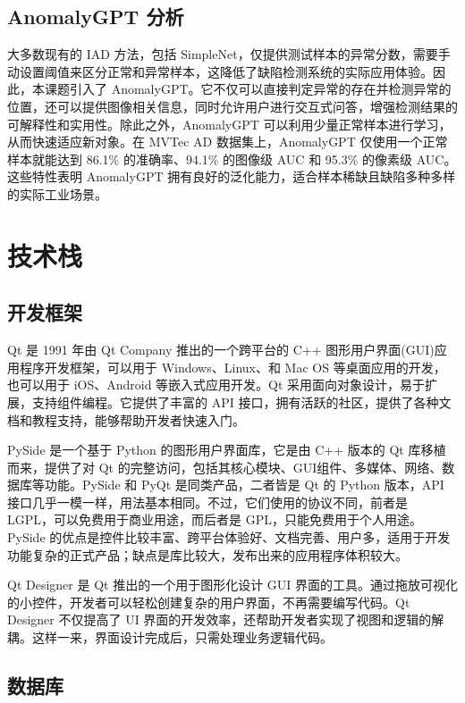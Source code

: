 \documentclass[
  ]{njuthesis}
\begin{document}
\subsection{AnomalyGPT 分析}

大多数现有的 IAD 方法，包括 SimpleNet，仅提供测试样本的异常分数，需要手动设置阈值来区分正常和异常样本，这降低了缺陷检测系统的实际应用体验。因此，本课题引入了 AnomalyGPT。它不仅可以直接判定异常的存在并检测异常的位置，还可以提供图像相关信息，同时允许用户进行交互式问答，增强检测结果的可解释性和实用性。除此之外，AnomalyGPT 可以利用少量正常样本进行学习，从而快速适应新对象。在 MVTec AD 数据集上，AnomalyGPT 仅使用一个正常样本就能达到 86.1\% 的准确率、94.1\% 的图像级 AUC 和 95.3\% 的像素级 AUC。这些特性表明 AnomalyGPT 拥有良好的泛化能力，适合样本稀缺且缺陷多种多样的实际工业场景。

\section{技术栈}

\subsection{开发框架}

Qt 是 1991 年由 Qt Company 推出的一个跨平台的 C++ 图形用户界面(GUI)应用程序开发框架，可以用于 Windows、Linux、和 Mac OS 等桌面应用的开发，也可以用于 iOS、Android 等嵌入式应用开发。Qt 采用面向对象设计，易于扩展，支持组件编程。它提供了丰富的 API 接口，拥有活跃的社区，提供了各种文档和教程支持，能够帮助开发者快速入门。

PySide 是一个基于 Python 的图形用户界面库，它是由 C++ 版本的 Qt 库移植而来，提供了对 Qt 的完整访问，包括其核心模块、GUI组件、多媒体、网络、数据库等功能。PySide 和 PyQt 是同类产品，二者皆是 Qt 的 Python 版本，API 接口几乎一模一样，用法基本相同。不过，它们使用的协议不同，前者是 LGPL，可以免费用于商业用途，而后者是 GPL，只能免费用于个人用途。PySide 的优点是控件比较丰富、跨平台体验好、文档完善、用户多，适用于开发功能复杂的正式产品；缺点是库比较大，发布出来的应用程序体积较大。

Qt Designer 是 Qt 推出的一个用于图形化设计 GUI 界面的工具。通过拖放可视化的小控件，开发者可以轻松创建复杂的用户界面，不再需要编写代码。Qt Designer 不仅提高了 UI 界面的开发效率，还帮助开发者实现了视图和逻辑的解耦。这样一来，界面设计完成后，只需处理业务逻辑代码。

\subsection{数据库}
\end{document}
